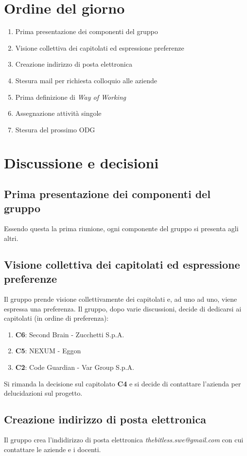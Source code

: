\documentclass[a4paper, 10pt, colorlinks=true, linkcolor=black, urlcolor=blue, citecolor=blue, hidelinks]{article}
\begin{document}
\section{Ordine del giorno}
\begin{enumerate}
    \item Prima presentazione dei componenti del gruppo
    \item Visione collettiva dei capitolati ed espressione preferenze
    \item Creazione indirizzo di posta elettronica
    \item Stesura mail per richiesta colloquio alle aziende
    \item Prima definizione di \textit{Way of Working}
    \item Assegnazione attività singole
    \item Stesura del prossimo ODG
\end{enumerate}

\section{Discussione e decisioni}
\subsection{Prima presentazione dei componenti del gruppo}
Essendo questa la prima riunione, ogni componente del gruppo si presenta agli altri. 

\subsection{Visione collettiva dei capitolati ed espressione preferenze}
Il gruppo prende visione collettivamente dei capitolati e, ad uno ad uno, viene espressa una preferenza. Il gruppo, dopo varie discussioni, decide di dedicarsi ai capitolati (in ordine di preferenza):
\begin{enumerate}
    \item \textbf{C6}: Second Brain - Zucchetti S.p.A.
    \item \textbf{C5}: NEXUM - Eggon
    \item \textbf{C2}: Code Guardian - Var Group S.p.A.
\end{enumerate}
Si rimanda la decisione sul capitolato \textbf{C4} e si decide di contattare l'azienda per delucidazioni sul progetto.

\subsection{Creazione indirizzo di posta elettronica}
Il gruppo crea l'indidirizzo di posta elettronica \textit{thebitless.swe@gmail.com} con cui contattare le aziende e i docenti.
\end{document}
